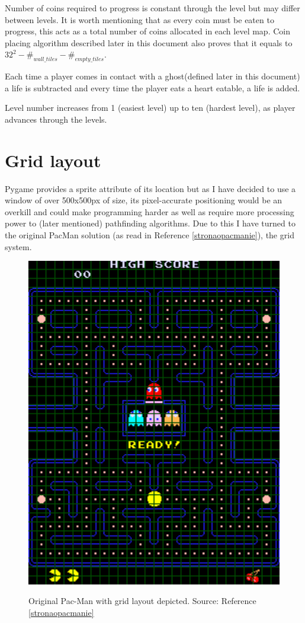 \documentclass[11pt,a4paper]{report}
\newenvironment{img}{
	\begin{center}
		\begin{figure}[H]
			\begin{center}
			
}{
	\end{center}
		\end{figure}
			\end{center}
}
\begin{document}
				Number of coins required to progress is constant through the level but may differ between levels. It is worth mentioning that as every coin must be eaten to progress, this acts as a total number of coins allocated in each level map. Coin placing algorithm described later in this document also proves that it equals to $32^2-\#_{wall\_tiles}-\#_{empty\_ tiles}$.
				
				Each time a player comes in contact with a ghost(defined later in this document) a life is subtracted and every time the player eats a heart eatable, a life is added.
				
				Level number increases from 1 (easiest level) up to ten (hardest level), as player advances through the levels.
		\section{Grid layout}
			\label{grid}
			Pygame provides a sprite attribute of its location but as I have decided to use a window of over 500x500px of size, its pixel-accurate positioning would be an overkill and could make programming harder as well as require more processing power to (later mentioned) pathfinding algorithms.
			Due to this I have turned to the original PacMan solution (as read in Reference \ref{stronaopacmanie}), the grid system.
			\begin{img}
				\includegraphics[width=350pt]{images/oryginal_pacman_grid}\\
				\caption{Original Pac-Man with grid layout depicted. Source: Reference \ref{stronaopacmanie}}
			\end{img}
\end{document}
